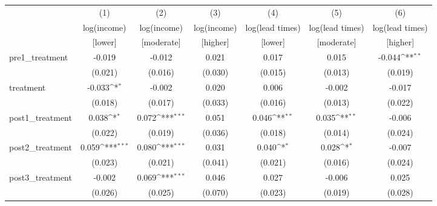{
\def\sym#1{\ifmmode^{#1}\else\(^{#1}\)\fi}
\begin{adjustbox}{max width=\textwidth}
\begin{tabular}{l*{6}{c}}
\toprule
            &\multicolumn{1}{c}{(1)}&\multicolumn{1}{c}{(2)}&\multicolumn{1}{c}{(3)}&\multicolumn{1}{c}{(4)}&\multicolumn{1}{c}{(5)}&\multicolumn{1}{c}{(6)}\\
            &\multicolumn{1}{c}{log(income)}&\multicolumn{1}{c}{log(income)}&\multicolumn{1}{c}{log(income)}&\multicolumn{1}{c}{log(lead times)}&\multicolumn{1}{c}{log(lead times)}&\multicolumn{1}{c}{log(lead times)}\\
            &[lower]&[moderate]&[higher]&[lower]&[moderate]&[higher]\\
\midrule
pre1\_treatment&      -0.019         &      -0.012         &       0.021         &       0.017         &       0.015         &      -0.044\sym{**} \\
            &     (0.021)         &     (0.016)         &     (0.030)         &     (0.015)         &     (0.013)         &     (0.019)         \\
\addlinespace
treatment   &      -0.033\sym{*}  &      -0.002         &       0.020         &       0.006         &      -0.002         &      -0.017         \\
            &     (0.018)         &     (0.017)         &     (0.033)         &     (0.016)         &     (0.013)         &     (0.022)         \\
\addlinespace
post1\_treatment&       0.038\sym{*}  &       0.072\sym{***}&       0.051         &       0.046\sym{**} &       0.035\sym{**} &      -0.006         \\
            &     (0.022)         &     (0.019)         &     (0.036)         &     (0.018)         &     (0.014)         &     (0.024)         \\
\addlinespace
post2\_treatment&       0.059\sym{***}&       0.080\sym{***}&       0.031         &       0.040\sym{*}  &       0.028\sym{*}  &      -0.007         \\
            &     (0.023)         &     (0.021)         &     (0.041)         &     (0.021)         &     (0.016)         &     (0.024)         \\
\addlinespace
post3\_treatment&      -0.002         &       0.069\sym{***}&       0.046         &       0.027         &      -0.006         &       0.025         \\
            &     (0.026)         &     (0.025)         &     (0.070)         &     (0.023)         &     (0.019)         &     (0.028)         \\

\end{tabular}
\end{adjustbox}}
